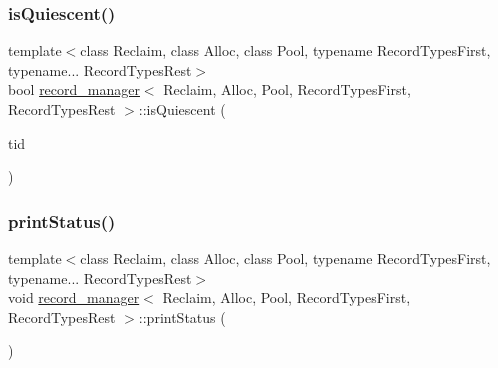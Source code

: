\subsubsection{\texorpdfstring{is\+Quiescent()}{isQuiescent()}}
{\footnotesize\ttfamily template$<$class Reclaim, class Alloc, class Pool, typename Record\+Types\+First, typename... Record\+Types\+Rest$>$ \\
bool \hyperlink{classrecord__manager}{record\+\_\+manager}$<$ Reclaim, Alloc, Pool, Record\+Types\+First, Record\+Types\+Rest $>$\+::is\+Quiescent (\begin{DoxyParamCaption}\item[{const int}]{tid }\end{DoxyParamCaption})\hspace{0.3cm}{\ttfamily [inline]}}

\mbox{\label{classrecord__manager_abb929ae26dc7d00c936c2c8878ccf8c3}} 
\subsubsection{\texorpdfstring{print\+Status()}{printStatus()}}
{\footnotesize\ttfamily template$<$class Reclaim, class Alloc, class Pool, typename Record\+Types\+First, typename... Record\+Types\+Rest$>$ \\
void \hyperlink{classrecord__manager}{record\+\_\+manager}$<$ Reclaim, Alloc, Pool, Record\+Types\+First, Record\+Types\+Rest $>$\+::print\+Status (\begin{DoxyParamCaption}\item[{void}]{ }\end{DoxyParamCaption})\hspace{0.3cm}{\ttfamily [inline]}}

\mbox{\label{classrecord__manager_a365022ebe1998ef801830406a6847fcc}} 

